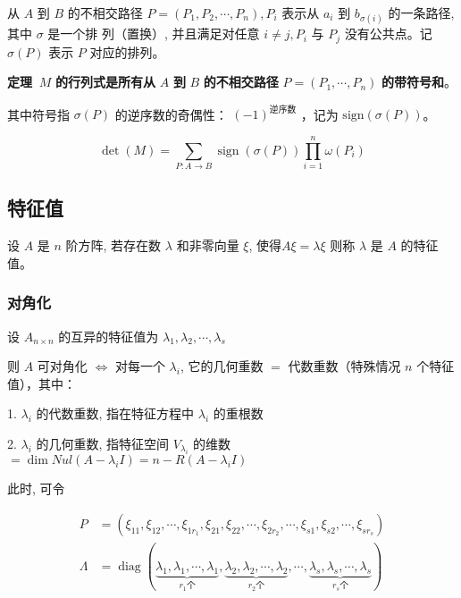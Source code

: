 从 $A$ 到 $B$ 的不相交路径 $P=\left(P_1, P_2, \cdots, P_n\right), P_i$ 表示从 $a_i$ 到 $b_{\sigma(i)}$ 的一条路径, 其中 $\sigma$ 是一个排 列（置换）, 并且满足对任意 $i \neq j, P_i$ 与 $P_j$ 没有公共点。记 $\sigma(P)$ 表示 $P$ 对应的排列。


\vspace{0.2cm}

\textbf{定理} $\ M$ \textbf{的行列式是所有从} $A$ \textbf{到} $B$ \textbf{的不相交路径} $P=\left(P_1, \cdots, P_n\right)$ \textbf{的带符号和}。

其中符号指 $\sigma(P)$ 的逆序数的奇偶性： $(-1)^{\text{逆序数}}$ ，记为 $\mathrm{sign}(\sigma(P))$。

\vspace{-0.2cm}

$$
\operatorname{det}(M)=\sum_{P: A \rightarrow B} \operatorname{sign}(\sigma(P)) \prod_{i=1}^n \omega\left(P_i\right)
$$

\vspace{-0.5cm}

\subsection{特征值}

设 $A$ 是 $n$ 阶方阵, 若存在数 $\lambda$ 和非零向量 $\xi$, 使得$A \xi=\lambda \xi$ 则称 $\lambda$ 是 $A$ 的特征值。


\subsubsection*{对角化}

\vspace{-0.1cm}

设 $A_{n \times n}$ 的互异的特征值为 $\lambda_1, \lambda_2, \cdots, \lambda_s$

则 $A$ 可对角化 $\Leftrightarrow$ 对每一个 $\lambda_i$, 它的几何重数 $=$ 代数重数（特殊情况 $n$ 个特征值），其中：

\hspace{0.4cm} 1. $\lambda_i$ 的代数重数, 指在特征方程中 $\lambda_i$ 的重根数

\hspace{0.4cm} 2. $\lambda_i$ 的几何重数, 指特征空间 $V_{\lambda_i}$ 的维数 $=\operatorname{dim} N u l\left(A-\lambda_i I\right)=n-R\left(A-\lambda_i I\right)$

此时, 可令 

\vspace{-0.6cm}

$$
\begin{array}{ll}
P &=\left(\xi_{11}, \xi_{12}, \cdots, \xi_{1 r_1}, \xi_{21}, \xi_{22}, \cdots, \xi_{2 r_2}, \cdots, \xi_{s 1}, \xi_{s 2}, \cdots, \xi_{s r_s}\right)\\
\Lambda &=\operatorname{diag}(\underbrace{\lambda_1, \lambda_1, \cdots, \lambda_1}_{r_1 \text{个}}, \underbrace{\lambda_2, \lambda_2, \cdots, \lambda_2}_{r_2 \text{个}}, \cdots, \underbrace{\lambda_s, \lambda_s, \cdots, \lambda_s}_{r_s \text{个}})
\end{array}
$$


